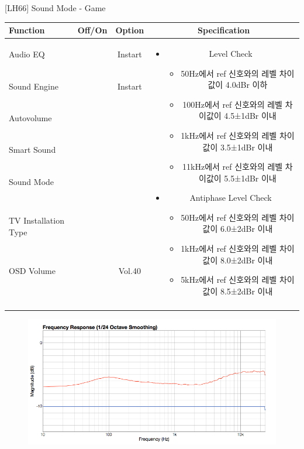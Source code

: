 \begin{frame}[t]{[LH66] Sound Mode - Game}
\begin{tiny}
\begin{tabular}{@{}lccc@{}}
\toprule
Function & Off/On & Option & Specification \\
\midrule
Audio EQ & \color{black}{Off} & Instart &
\multirow{10}{60mm}{
\begin{itemize}
\item Level Check
  \begin{itemize}
  \item 50Hz에서 ref 신호와의 레벨 차이값이 4.0dBr 이하
  \item 100Hz에서 ref 신호와의 레벨 차이값이 4.5±1dBr 이내
  \item 1kHz에서 ref 신호와의 레벨 차이값이 3.5±1dBr 이내
  \item 11kHz에서 ref 신호와의 레벨 차이값이 5.5±1dBr 이내
  \end{itemize}
\item Antiphase Level Check
  \begin{itemize}
  \item 50Hz에서 ref 신호와의 레벨 차이값이 6.0±2dBr 이내
  \item 1kHz에서 ref 신호와의 레벨 차이값이 8.0±2dBr 이내
  \item 5kHz에서 ref 신호와의 레벨 차이값이 8.5±2dBr 이내
  \end{itemize}
\end{itemize}
} \\
Sound Engine & \color{blue}{On} & Instart & \\
Autovolume & \color{black}{Off} & & \\
Smart Sound & \color{black}{Off} & & \\
Sound Mode & \color{blue}{On} & \color{blue}{Game} & \\
TV Installation Type & \color{blue}{On} & \color{black}{Standtype1} & \\
OSD Volume & \color{blue}{On} & Vol.40 & \\
& & & \\
& & & \\
& & & \\
& & & \\
\midrule
\end{tabular}
\end{tiny}

\begin{figure}[b]
\includegraphics[height=0.3\textwidth]{figures/game.png}
\end{figure}


\end{frame}
